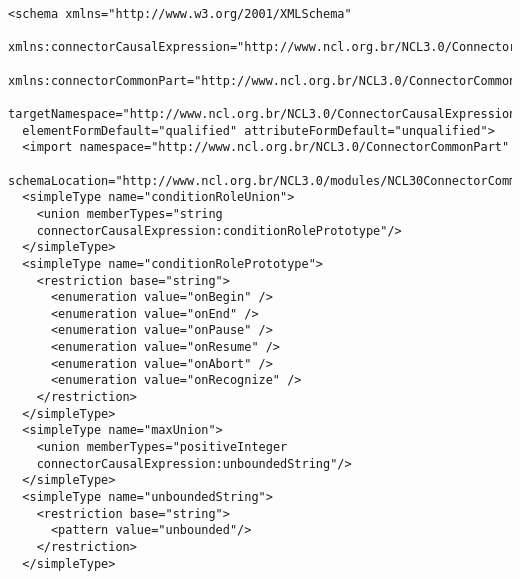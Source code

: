 \begin{listing}[t]
\begin{verbatim}
<schema xmlns="http://www.w3.org/2001/XMLSchema"
  xmlns:connectorCausalExpression="http://www.ncl.org.br/NCL3.0/ConnectorCausalExpression"
  xmlns:connectorCommonPart="http://www.ncl.org.br/NCL3.0/ConnectorCommonPart"
  targetNamespace="http://www.ncl.org.br/NCL3.0/ConnectorCausalExpression"
  elementFormDefault="qualified" attributeFormDefault="unqualified">
  <import namespace="http://www.ncl.org.br/NCL3.0/ConnectorCommonPart"
  schemaLocation="http://www.ncl.org.br/NCL3.0/modules/NCL30ConnectorCommonPart.xsd"/>
  <simpleType name="conditionRoleUnion">
    <union memberTypes="string
    connectorCausalExpression:conditionRolePrototype"/>
  </simpleType>
  <simpleType name="conditionRolePrototype">
    <restriction base="string">
      <enumeration value="onBegin" />
      <enumeration value="onEnd" />
      <enumeration value="onPause" />
      <enumeration value="onResume" />
      <enumeration value="onAbort" />
      <enumeration value="onRecognize" />
    </restriction>
  </simpleType>
  <simpleType name="maxUnion">
    <union memberTypes="positiveInteger
    connectorCausalExpression:unboundedString"/>
  </simpleType>
  <simpleType name="unboundedString">
    <restriction base="string">
      <pattern value="unbounded"/>
    </restriction>
  </simpleType>
\end{verbatim}
\end{listing}

